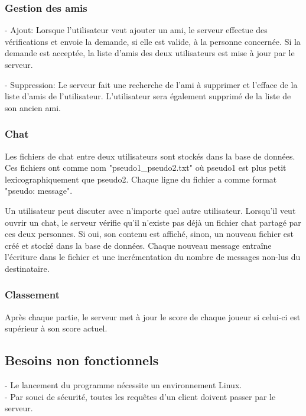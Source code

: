\documentclass[a4paper,12pt]{article}
\begin{document}
\subsubsection{Gestion des amis}

- Ajout: Lorsque l'utilisateur veut ajouter un ami, le serveur effectue des vérifications et envoie la demande, si elle est valide, à la personne concernée. Si la demande est acceptée, la liste d'amis des deux utilisateurs est mise à jour par le serveur.

- Suppression: Le serveur fait une recherche de l'ami à supprimer et l'efface de la liste d'amis de l'utilisateur. L'utilisateur sera également supprimé de la liste de son ancien ami.

\subsubsection{Chat}

Les fichiers de chat entre deux utilisateurs sont stockés dans la base de données. Ces fichiers ont comme nom "pseudo1\_pseudo2.txt" où pseudo1 est plus petit lexicographiquement que pseudo2. Chaque ligne du fichier a comme format "pseudo: message".

Un utilisateur peut discuter avec n'importe quel autre utilisateur. Lorsqu'il veut ouvrir un chat, le serveur vérifie qu'il n'existe pas déjà un fichier chat partagé par ces deux personnes. Si oui, son contenu est affiché, sinon, un nouveau fichier est créé et stocké dans la base de données. Chaque nouveau message entraîne l'écriture dans le fichier et une incrémentation du nombre de messages non-lus du destinataire.

\subsubsection{Classement}

Après chaque partie, le serveur met à jour le score de chaque joueur si celui-ci est supérieur à son score actuel.

\subsection{Besoins non fonctionnels}

- Le lancement du programme nécessite un environnement Linux.\\
- Par souci de sécurité, toutes les requêtes d'un client doivent passer par le serveur.
\end{document}
